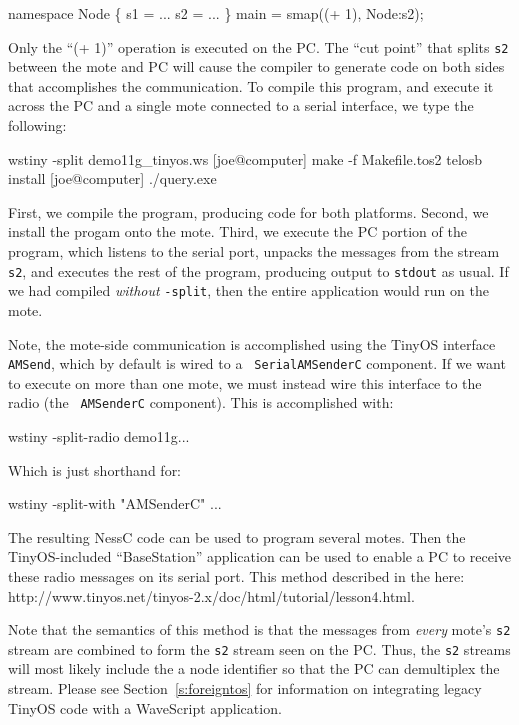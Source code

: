 \documentclass[twocolumn]{report}
\newcommand{\cde}{\tt}
\begin{document}
\begin{code}
  namespace Node \{
    s1 = ...
    s2 = ...
  \}
  main = smap((+ 1), Node:s2);
\end{code}

Only the ``(+ 1)'' operation is executed on the PC.  The ``cut point''
that splits {\cde s2} between the mote and PC will cause the compiler
to generate code on both sides that accomplishes the communication.
To compile this program, and execute it across the PC and a single
mote connected to a serial interface, we type the following:

\begin{code}
 wstiny -split demo11g\_tinyos.ws
[joe@computer] make -f Makefile.tos2 telosb install
[joe@computer] ./query.exe
\end{code}

First, we compile the program, producing code for both platforms.
Second, we install the progam onto the mote.  Third, we execute the PC
portion of the program, which listens to the serial port, unpacks the
messages from the stream {\cde s2}, and executes the rest of the
program, producing output to {\tt stdout} as usual.
%
If we had compiled {\em without} {\cde -split}, then the entire
application would run on the mote.

Note, the mote-side communication is accomplished using the TinyOS
interface {\cde AMSend}, which by default is wired to a {\cde
  SerialAMSenderC} component.  If we want to execute on more than one
mote, we must instead wire this interface to the radio (the {\cde
  AMSenderC} component).  This is accomplished with:

\begin{code}
 wstiny -split-radio demo11g...
\end{code}

Which is just shorthand for:

\begin{code}
 wstiny -split-with "AMSenderC" ...
\end{code}

The resulting NessC code can be used to program several motes.  Then
the TinyOS-included ``BaseStation'' application can be used to enable
a PC to receive these radio messages on its serial port.  This method
described in the here:  
  {http://www.tinyos.net/tinyos-2.x/doc/html/tutorial/lesson4.html}.

Note that the semantics of this method is that the messages from {\em
  every} mote's {\cde s2} stream are combined to form the {\cde s2}
stream seen on the PC.  Thus, the {\cde s2} streams will most likely
include the a node identifier so that the PC can demultiplex the
stream.  Please see Section~\ref{s:foreigntos} for information on integrating
legacy TinyOS code with a WaveScript application.
\end{document}
